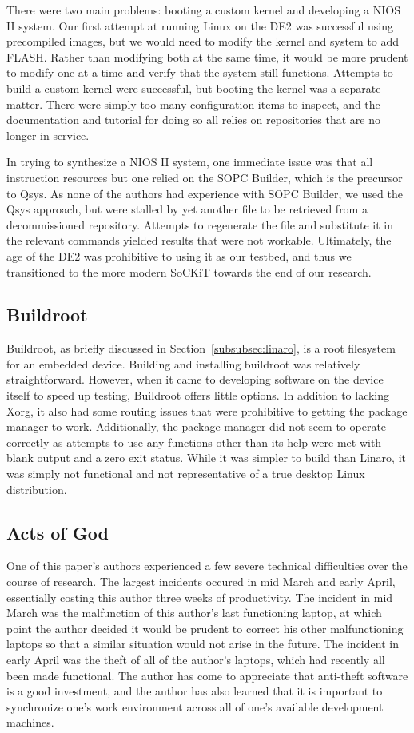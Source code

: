 \documentclass{sig-alternate-10pt}
\begin{document}
There were two main problems: booting a custom kernel and developing a NIOS
II system. Our first attempt at running Linux on the DE2 was successful
using precompiled images, but we would need to modify the kernel and system
to add FLASH. Rather than modifying both at the same time, it would be more
prudent to modify one at a time and verify that the system still functions.
Attempts to build a custom kernel were successful, but booting the kernel
was a separate matter. There were simply too many configuration items to
inspect, and the documentation and tutorial for doing so all relies on
repositories that are no longer in service.

In trying to synthesize a NIOS II system, one immediate issue was that all
instruction resources but one relied on the SOPC Builder, which is the precursor to
Qsys. As none of the authors had experience with SOPC Builder, we used the
Qsys approach, but were stalled by yet another file to be retrieved from
a decommissioned repository. Attempts to regenerate the file and substitute
it in the relevant commands yielded results that were not workable.
Ultimately, the age of the DE2 was prohibitive to using it as our testbed,
and thus we transitioned to the more modern SoCKiT towards the end of our
research.

\subsection{Buildroot}
Buildroot, as briefly discussed in Section~\ref{subsubsec:linaro}, is a root
filesystem for an embedded device. Building and installing buildroot was
relatively straightforward. However, when it came to developing software on
the device itself to speed up testing, Buildroot offers little options. In
addition to lacking Xorg, it also had some routing issues that were
prohibitive to getting the package manager to work. Additionally, the
package manager did not seem to operate correctly as attempts to use any
functions other than its help were met with blank output and a zero exit
status. While it was simpler to build than Linaro, it was simply not
functional and not representative of a true desktop Linux distribution.

\subsection{Acts of God}
One of this paper's authors experienced a few severe technical difficulties
over the course of research. The largest incidents occured in mid March and
early April, essentially costing this author three weeks of productivity.
The incident in mid March was the malfunction of this author's last
functioning laptop, at which point the author decided it would be prudent to
correct his other malfunctioning laptops so that a similar situation would
not arise in the future. The incident in early April was the theft of all of
the author's laptops, which had recently all been made functional. The
author has come to appreciate that anti-theft software is a good investment,
and the author has also learned that it is important to synchronize one's
work environment across all of one's available development machines.
\end{document}
